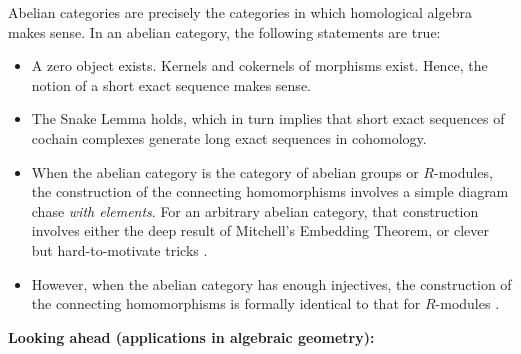 Abelian categories are precisely the categories in which homological algebra makes sense.
In an abelian category, the following statements are true:
\begin{itemize}
\item
	A zero object exists.
	Kernels and cokernels of morphisms exist.
	Hence, the notion of a short exact sequence makes sense.
\item
	The Snake Lemma holds, which in turn implies that
	short exact sequences of cochain complexes generate long exact sequences in cohomology.
\item
	When the abelian category is the category of abelian groups or $R$-modules,
	the construction of the connecting homomorphisms involves a simple diagram chase \textit{\color{red}with elements}.
	For an arbitrary abelian category, that construction involves either the deep result
	of Mitchell's Embedding Theorem, or clever but hard-to-motivate tricks \cite{Surowski2000}.
\item
	However, when the abelian category has {\color{red}enough injectives},
	the construction of the connecting homomorphisms is formally identical to
	that for $R$-modules \cite{Surowski2000}.
\end{itemize}
\vskip 0.5cm
\noindent
\textbf{Looking ahead (applications in algebraic geometry):}
